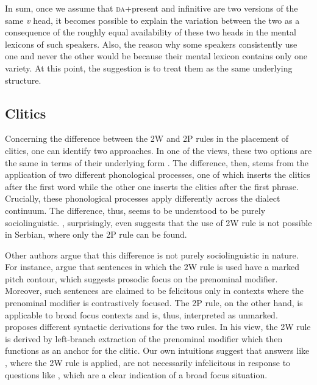 \documentclass[output=paper,
modfonts,
newtxmath,
hidelinks,
]{langscibook}
\begin{document}
\noindent In sum, once we assume that \textsc{da}+present and infinitive are two versions of the same \textit{v} head, it becomes possible to explain the variation between the two as a consequence of the roughly equal availability of these two heads in the mental lexicons of such speakers. Also, the reason why some speakers consistently use one and never the other would be because their mental lexicon contains only one variety. At this point, the suggestion is to treat them as the same underlying structure.

\subsection{Clitics}\label{s4.2}

Concerning the difference between the 2W and 2P rules in the placement of cli\-tics, one can identify two approaches. In one of the views, these two options are the same in terms of their underlying form \citep{Ronelle2006,Ronelle2008,Yu2008}. The difference, then, stems from the application of two different phonological processes, one of which inserts the clitics after the first word while the other one inserts the clitics after the first phrase. Crucially, these phonological processes apply differently across the dialect continuum. The difference, thus, seems to be understood to be purely sociolinguistic. \citet{Anderson2005}, surprisingly, even suggests that the use of 2W rule is not possible in Serbian, where only the 2P rule can be found.

Other authors argue that this difference is not purely sociolinguistic in nature. For instance, \citet{DiesingEtAl2009} argue that sentences in which the 2W rule is used have a marked pitch contour, which suggests prosodic focus on the prenominal modifier. Moreover, such sentences are claimed to be felicitous only in contexts where the prenominal modifier is contrastively focused. The 2P rule, on the other hand, is applicable to broad focus contexts and is, thus, interpreted as unmarked. \citet{Boskovic2009} proposes different syntactic derivations for the two rules. In his view, the 2W rule is derived by left-branch extraction of the prenominal modifier which then functions as an anchor for the clitic. Our own intuitions suggest that answers like , where the 2W rule is applied, are not necessarily infelicitous in response to questions like , which are a clear indication of a broad focus situation.

\ea \label{ex18}
	\z
\z
\end{document}
